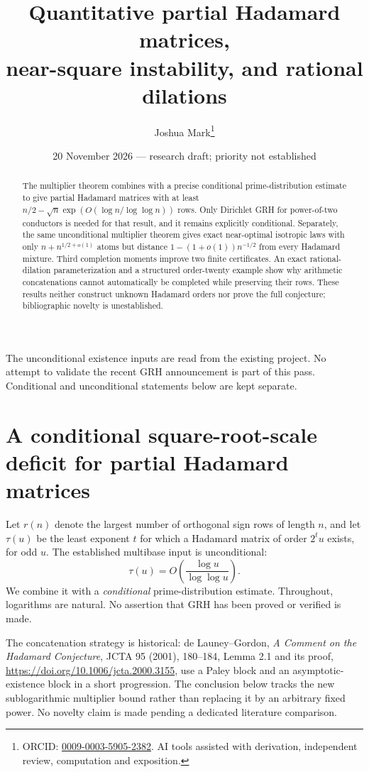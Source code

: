 \documentclass[11pt]{article}
\title{Quantitative partial Hadamard matrices,\\near-square instability, and rational dilations}
\author{Joshua Mark\thanks{ORCID: \href{https://orcid.org/0009-0003-5905-2382}{0009-0003-5905-2382}. AI tools assisted with derivation, independent review, computation and exposition.}}
\date{20 November 2026 --- research draft; priority not established}
\begin{document}
\maketitle

\begin{abstract}
The multiplier theorem combines with a precise conditional
prime-distribution estimate to give partial Hadamard matrices with
at least $n/2-\sqrt n\exp(O(\log n/\log\log n))$ rows.
Only Dirichlet GRH for power-of-two conductors is needed for that
result, and it remains explicitly conditional.
Separately, the same unconditional multiplier theorem gives exact
near-optimal isotropic laws with only $n+n^{1/2+o(1)}$ atoms but
distance $1-(1+o(1))n^{-1/2}$ from every Hadamard mixture.
Third completion moments improve two finite certificates.
An exact rational-dilation parameterization and a structured
order-twenty example show why arithmetic concatenations cannot
automatically be completed while preserving their rows.
These results neither construct unknown Hadamard orders nor prove
the full conjecture; bibliographic novelty is unestablished.
\end{abstract}
The unconditional existence inputs are read from the existing project.
No attempt to validate the recent GRH announcement is part of this
pass. Conditional and unconditional statements below are kept separate.
\section{A conditional square-root-scale deficit for partial Hadamard matrices}
\label{sec:conditional-half-frame}

Let $r(n)$ denote the largest number of orthogonal sign rows of length
$n$, and let $\tau(u)$ be the least exponent $t$ for which a Hadamard
matrix of order $2^tu$ exists, for odd $u$. The established multibase
input is unconditional:
\[
 \tau(u)=O\!\left(\frac{\log u}{\log\log u}\right).
\]
We combine it with a \emph{conditional} prime-distribution estimate.
Throughout, logarithms are natural. No assertion that GRH has been
proved or verified is made.

The concatenation strategy is historical: de Launey--Gordon,
\emph{A Comment on the Hadamard Conjecture}, JCTA 95 (2001),
180--184, Lemma 2.1 and its proof,
\url{https://doi.org/10.1006/jcta.2000.3155}, use a Paley block and
an asymptotic-existence block in a short progression. The conclusion
below tracks the new sublogarithmic multiplier bound rather than
replacing it by an arbitrary fixed power. No novelty claim is made
pending a dedicated literature comparison.
\end{document}
